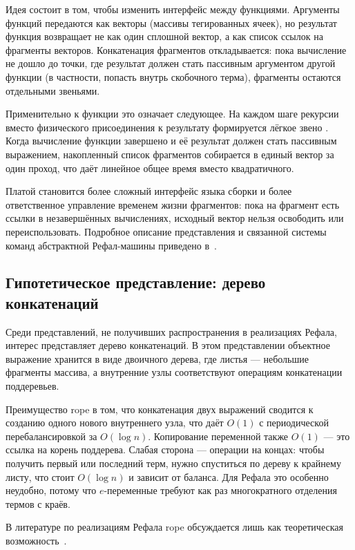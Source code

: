Идея состоит в том, чтобы изменить интерфейс между функциями. Аргументы
функций передаются как векторы (массивы тегированных ячеек), но
результат функция возвращает не как один сплошной вектор, а как
список ссылок на фрагменты векторов. Конкатенация фрагментов
откладывается: пока вычисление не дошло до точки, где результат должен
стать пассивным аргументом другой функции (в частности, попасть внутрь
скобочного терма), фрагменты остаются отдельными звеньями.

Применительно к функции  это означает следующее. На каждом шаге
рекурсии вместо физического присоединения  к результату
 формируется лёгкое звено . Когда вычисление функции завершено и её
результат должен стать пассивным выражением, накопленный список
фрагментов собирается в единый вектор за один проход, что даёт линейное
общее время вместо квадратичного.

Платой становится более сложный интерфейс языка сборки и более
ответственное управление временем жизни фрагментов: пока на фрагмент есть
ссылки в незавершённых вычислениях, исходный вектор нельзя освободить или
переиспользовать. Подробное описание представления и связанной системы
команд абстрактной Рефал-машины приведено в~\cite{skorobogatov_repr}.

\subsection{Гипотетическое представление: дерево конкатенаций}
\label{sec:rope-repr}

Среди представлений, не получивших распространения в реализациях Рефала,
интерес представляет дерево конкатенаций. В этом
представлении объектное выражение хранится в виде двоичного дерева, где
листья --- небольшие фрагменты массива, а внутренние узлы соответствуют
операциям конкатенации поддеревьев.

Преимущество rope в том, что конкатенация двух выражений сводится к
созданию одного нового внутреннего узла, что даёт \(O(1)\) с периодической
перебалансировкой за \(O(\log n)\). Копирование переменной также \(O(1)\)
--- это ссылка на корень поддерева. Слабая сторона --- операции на
концах: чтобы получить первый или последний терм, нужно спуститься по
дереву к крайнему листу, что стоит \(O(\log n)\) и зависит от баланса.
Для Рефала это особенно неудобно, потому что \(e\)-переменные требуют как
раз многократного отделения термов с краёв.

В литературе по реализациям Рефала rope обсуждается лишь как теоретическая
возможность~\cite{refal05_site}.

